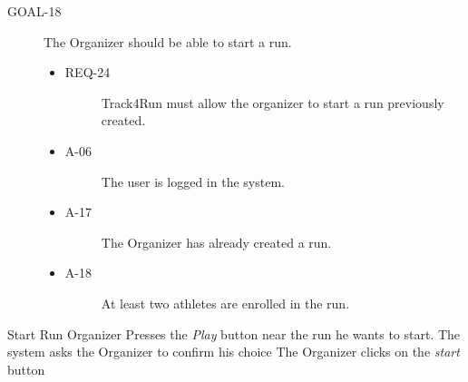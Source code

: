 \documentclass[a4paper]{article}
\newcommand{\requirement}{\ding{229}}%
\begin{document}
        
        \begin{description}
        	\item[GOAL-18] The Organizer should be able to start a run.
            	\begin{itemize}
            	    \item[\requirement]
                	\begin{description}
                	\item[REQ-24] Track4Run must allow the organizer to start a run previously created.
                	\end{description}
                	\item
                	\begin{description}
                	\item[A-06] The user is logged in the system.
                	\end{description}
                	\item
                	\begin{description}
                	\item[A-17] The Organizer has already created a run.  
                	\end{description}
                	\item
                	\begin{description}
                	\item[A-18] At least two athletes are enrolled in the run.
                	\end{description}
                	\end{itemize}
        \end{description}
        
        
        \begin{usecase}{Start Run}
              {Organizer Presses the \textit{Play} button near the run he wants to start.}
              {The system asks the Organizer to confirm his choice}
              {The Organizer clicks on the \textit{start} button}
        \end{usecase}
        
\end{document}
